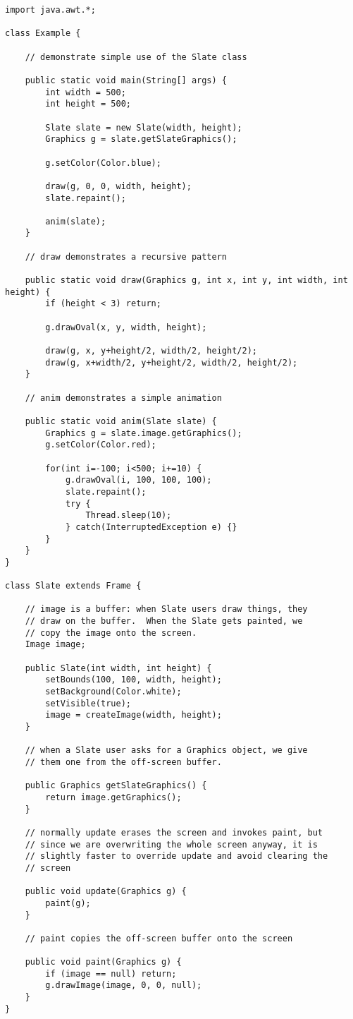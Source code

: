 \documentclass{book}
\begin{document}
\begin{verbatim}
import java.awt.*;

class Example {

    // demonstrate simple use of the Slate class

    public static void main(String[] args) {
        int width = 500;
        int height = 500;
	
        Slate slate = new Slate(width, height);
        Graphics g = slate.getSlateGraphics();

        g.setColor(Color.blue);

        draw(g, 0, 0, width, height);
        slate.repaint();
	
        anim(slate);
    }

    // draw demonstrates a recursive pattern
    
    public static void draw(Graphics g, int x, int y, int width, int height) {
        if (height < 3) return;
	
        g.drawOval(x, y, width, height);
	
        draw(g, x, y+height/2, width/2, height/2);
        draw(g, x+width/2, y+height/2, width/2, height/2);
    }
    
    // anim demonstrates a simple animation
    
    public static void anim(Slate slate) {
        Graphics g = slate.image.getGraphics();
        g.setColor(Color.red);
	
        for(int i=-100; i<500; i+=10) {
            g.drawOval(i, 100, 100, 100);
            slate.repaint();
            try {
                Thread.sleep(10);
            } catch(InterruptedException e) {}
        }
    }
}

class Slate extends Frame {
    
    // image is a buffer: when Slate users draw things, they
    // draw on the buffer.  When the Slate gets painted, we
    // copy the image onto the screen.
    Image image;
    
    public Slate(int width, int height) {
        setBounds(100, 100, width, height);
        setBackground(Color.white);
        setVisible(true);
        image = createImage(width, height);
    }
    
    // when a Slate user asks for a Graphics object, we give
    // them one from the off-screen buffer.
    
    public Graphics getSlateGraphics() {
        return image.getGraphics();
    }
    
    // normally update erases the screen and invokes paint, but
    // since we are overwriting the whole screen anyway, it is
    // slightly faster to override update and avoid clearing the
    // screen
    
    public void update(Graphics g) {
        paint(g);
    }
    
    // paint copies the off-screen buffer onto the screen
    
    public void paint(Graphics g) {
        if (image == null) return;
        g.drawImage(image, 0, 0, null);
    }
}
\end{verbatim}
\end{document}
